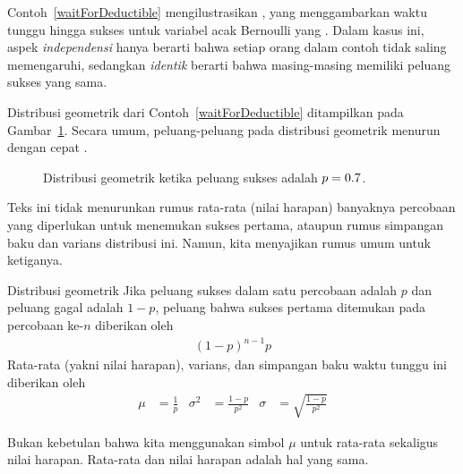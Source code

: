 Contoh~\ref{waitForDeductible} mengilustrasikan
, yang menggambarkan
waktu tunggu hingga sukses untuk variabel acak Bernoulli yang
.
Dalam kasus ini, aspek \emph{independensi} hanya berarti
bahwa setiap orang dalam contoh tidak saling memengaruhi, sedangkan
\emph{identik} berarti bahwa masing-masing memiliki peluang sukses yang
sama.

Distribusi geometrik dari Contoh~\ref{waitForDeductible} ditampilkan pada
Gambar~\ref{geometricDist70}. Secara umum, peluang-peluang pada distribusi
geometrik menurun dengan cepat .

\begin{figure}[h]
  \centering
  \caption{Distribusi geometrik ketika peluang sukses adalah
      $p = 0.7{}$.}
  \label{geometricDist70}
\end{figure}

Teks ini tidak menurunkan rumus rata-rata (nilai harapan) banyaknya
percobaan yang diperlukan untuk menemukan sukses pertama, ataupun rumus
simpangan baku dan varians distribusi ini. Namun, kita menyajikan rumus
umum untuk ketiganya.

\begin{onebox}{Distribusi geometrik}
  Jika peluang sukses dalam satu percobaan adalah $p$ dan peluang gagal
  adalah $1-p$, peluang bahwa sukses pertama ditemukan pada percobaan
  ke-$n$ diberikan oleh\vspace{-1.5mm}
  \begin{align*}
  (1-p)^{n-1}p
  \end{align*}
  Rata-rata (yakni nilai harapan), varians, dan simpangan baku waktu
  tunggu ini diberikan oleh
  \begin{align*}
  \mu &= \frac{1}{p}
      &\sigma^2 &=\frac{1-p}{p^2}
      &\sigma &= \sqrt{\frac{1-p}{p^2}}
  \end{align*}
\end{onebox}

Bukan kebetulan bahwa kita menggunakan simbol $\mu$ untuk rata-rata
sekaligus nilai harapan. Rata-rata dan nilai harapan adalah hal yang sama.

